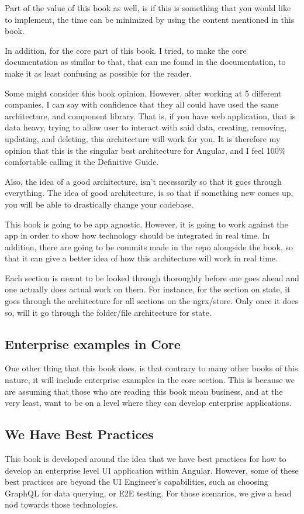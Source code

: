 Part of the value of this book as well, is if this is something that you would
like to implement, the time can be minimized by using the content mentioned
in this book.

In addition, for the core part of this book. I tried, to make the core
documentation as similar to that, that can me found in the documentation, to make
it as least confusing as possible for the reader.

Some might consider this book opinion. However, after working at 5 different
companies, I can say with confidence that they all could have used the same
architecture, and component library. That is, if you have web application, that
is data heavy, trying to allow user to interact with said data, creating,
removing, updating, and deleting, this architecture will work for you. It is
therefore my opinion that this is the singular best architecture for Angular,
and I feel 100\% comfortable calling it the Definitive Guide.

Also, the idea of a good architecture, isn't necessarily so that it goes through
everything. The idea of good architecture, is so that if something new comes up,
you will be able to drastically change your codebase. %

This book is going to be app agnostic. However, it is going to work against the
app in order to show how technology should be integrated in real time. In
addition, there are going to be commits made in the repo alongside the book,
so that it can give a better idea of how this architecture will work in real
time.

Each section is meant to be looked through thoroughly before one goes ahead and
one actually does actual work on them. For instance, for the section on state,
it goes through the architecture for all sections on the ngrx/store. Only once
it does so, will it go through the folder/file architecture for state.

\subsection{Enterprise examples in Core}
One other thing that this book does, is that contrary to many other books of
this nature, it will include enterprise examples in the core section. This is
because we are assuming that those who are reading this book mean business, and 
at the very least, want to be on a level where they can develop enterprise
applications.

\subsection{ We Have Best Practices }
This book is developed around the idea that we have best practices for how to
develop an enterprise level UI application within Angular. However, some of 
these best practices are beyond the UI Engineer's capabilities, such as 
choosing GraphQL for data querying, or E2E testing. For those scenarios, we 
give a head nod towards those technologies. 
